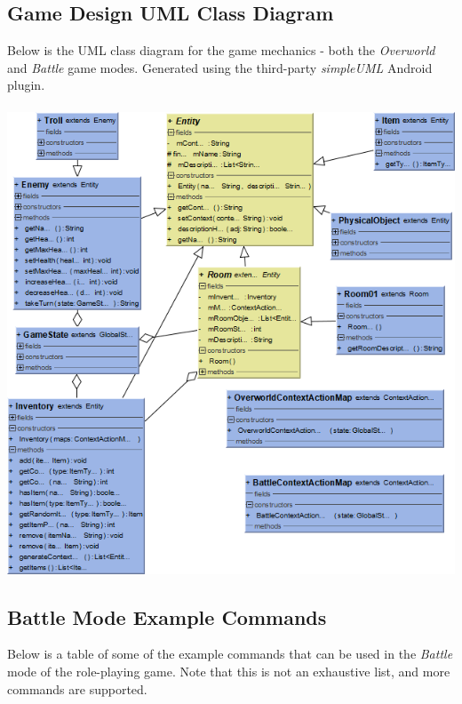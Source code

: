 \documentclass[11pt]{article}
\begin{document}
\begin{appendices}
\subsection{Game Design UML Class Diagram}
\label{appendix:game-uml}
Below is the UML class diagram for the game mechanics - both the \textit{Overworld} and \textit{Battle} game modes. Generated using the third-party \textit{simpleUML} Android plugin.
\\
\\
\includegraphics[width=\textwidth]{game-uml.png}

\newpage
\subsection{Battle Mode Example Commands}
\label{appendix:battle-examples}

Below is a table of some of the example commands that can be used in the \textit{Battle} mode of the role-playing game. Note that this is not an exhaustive list, and more commands are supported.


\end{appendices}
\end{document}
